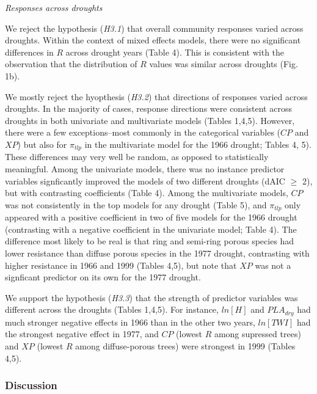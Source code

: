 \documentclass[]{article}
\begin{document}
\emph{Responses across droughts}

We reject the hypothesis (\emph{H3.1}) that overall community responses
varied across droughts. Within the context of mixed effects models,
there were no significant differences in \(R\) across drought years
(Table 4). This is consistent with the observation that the distribution
of \(R\) values was similar across droughts (Fig. 1b).

We mostly reject the hyopthesis (\emph{H3.2}) that directions of
responses varied across droughts. In the majority of cases, response
directions were consistent across droughts in both univariate and
multivariate models (Tables 1,4,5). However, there were a few
exceptions--most commonly in the categorical variables (\(CP\) and
\(XP\)) but also for \(\pi_{tlp}\) in the multivariate model for the
1966 drought; Tables 4, 5). These differences may very well be random,
as opposed to statistically meaningful. Among the univariate models,
there was no instance predictor variables signficantly improved the
models of two different droughts (dAIC \(\ge\) 2), but with contrasting
coefficients (Table 4). Among the multivariate models, \(CP\) was not
consistently in the top models for any drought (Table 5), and
\(\pi_{tlp}\) only appeared with a positive coefficient in two of five
models for the 1966 drought (contrasting with a negative coefficient in
the univariate model; Table 4). The difference most likely to be real is
that ring and semi-ring porous species had lower resistance than diffuse
porous species in the 1977 drought, contrasting with higher resistance
in 1966 and 1999 (Tables 4,5), but note that \(XP\) was not a signficant
predictor on its own for the 1977 drought.

We support the hypothesis (\emph{H3.3}) that the strength of predictor
variables was different across the droughts (Tables 1,4,5). For
instance, \(ln[H]\) and \(PLA_{dry}\) had much stronger negative effects
in 1966 than in the other two years, \(ln[TWI]\) had the strongest
negative effect in 1977, and \(CP\) (lowest \(R\) among supressed trees)
and \(XP\) (lowest \(R\) among diffuse-porous trees) were strongest in
1999 (Tables 4,5).

\hypertarget{discussion}{%
\subsubsection{Discussion}\label{discussion}}
\end{document}
